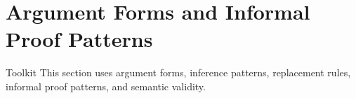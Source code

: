 \section{Argument Forms and Informal Proof Patterns}

\begin{toolkitbox}{Toolkit}
This section uses argument forms, inference patterns, replacement rules,
informal proof patterns, and semantic validity.
\end{toolkitbox}












